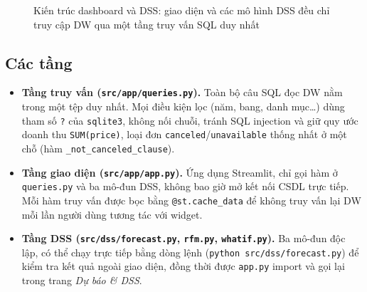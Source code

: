 \documentclass[12pt,a4paper]{article}
\newcommand{\code}[1]{\texttt{\small #1}}
\begin{document}
\begin{figure}[h]
\centering
{}
\caption{Kiến trúc dashboard và DSS: giao diện và các mô hình DSS đều chỉ truy cập DW qua một tầng truy vấn SQL duy nhất}\label{fig:arch-b}
\end{figure}

\subsection{Các tầng}
\begin{itemize}[nosep]
  \item \textbf{Tầng truy vấn (\code{src/app/queries.py}).} Toàn bộ câu SQL đọc DW nằm trong một tệp duy nhất.
        Mọi điều kiện lọc (năm, bang, danh mục\ldots) dùng tham số \code{?} của \code{sqlite3}, không nối chuỗi,
        tránh SQL injection và giữ quy ước doanh thu \code{SUM(price)}, loại đơn \code{canceled}/\code{unavailable}
        thống nhất ở một chỗ (hàm \code{\_not\_canceled\_clause}).
  \item \textbf{Tầng giao diện (\code{src/app/app.py}).} Ứng dụng Streamlit, chỉ gọi hàm ở \code{queries.py}
        và ba mô-đun DSS, không bao giờ mở kết nối CSDL trực tiếp. Mỗi hàm truy vấn được bọc bằng
        \code{@st.cache\_data} để không truy vấn lại DW mỗi lần người dùng tương tác với widget.
  \item \textbf{Tầng DSS (\code{src/dss/forecast.py}, \code{rfm.py}, \code{whatif.py}).} Ba mô-đun độc lập, có thể
        chạy trực tiếp bằng dòng lệnh (\code{python src/dss/forecast.py}) để kiểm tra kết quả ngoài giao diện,
        đồng thời được \code{app.py} import và gọi lại trong trang \emph{Dự báo \& DSS}.
\end{itemize}
\end{document}
